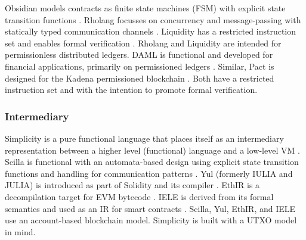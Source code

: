 Obsidian models contracts as finite state machines (FSM) with explicit state transition functions \cite{Coblenz2017}.
Rholang focusses on concurrency and message-passing with statically typed communication channels \cite{Meredith2018}.
Liquidity has a restricted instruction set and enables formal verification \cite{OCamlProSAS2018}.
Rholang and Liquidity are intended for permissionless distributed ledgers.
DAML is functional and developed for financial applications, primarily on permissioned ledgers \cite{Shaul2018,Meier2018,Lippmeier2018,Huschenbett2018,Bernauer2018,Maric2018,Bleikertz2018,Lochbihler2018,Pilav2018}.
Similar, Pact is designed for the Kadena permissioned blockchain \cite{Popejoy2017}.
Both have a restricted instruction set and with the intention to promote formal verification.


\subsubsection{Intermediary}
Simplicity is a pure functional language that places itself as an intermediary representation between a higher level (functional) language and a low-level VM \cite{OConnor2017}. 
Scilla is functional with an automata-based design using explicit state transition functions and handling for communication patterns \cite{Sergey2018}. 
Yul (formerly IULIA and JULIA) is introduced as part of Solidity and its compiler \cite{EthereumFoundation2018IULIA}. 
EthIR is a decompilation target for EVM bytecode \cite{Albert2018}. 
IELE is derived from its formal semantics and used as an IR for smart contracts \cite{Kasampalis2018}. 
Scilla, Yul, EthIR, and IELE use an account-based blockchain model. Simplicity is built with a UTXO model in mind.

